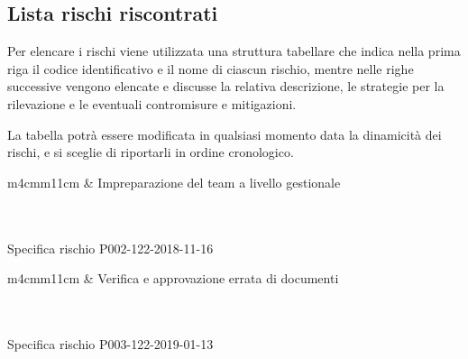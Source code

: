 	\subsection{Lista rischi riscontrati}

	Per elencare i rischi viene utilizzata una struttura tabellare che indica nella prima riga il codice identificativo e il nome di ciascun rischio,
	mentre nelle righe successive vengono elencate e discusse la relativa descrizione, le strategie per la rilevazione e le eventuali contromisure e mitigazioni.\par

	La tabella potrà essere modificata in qualsiasi momento data la dinamicità dei rischi, e si sceglie di riportarli in ordine cronologico.


	\begin{table}[H]
		\begin{risktable}{\columnwidth}{m{4cm}m{11cm}}
			 &
			Impreparazione del team a livello gestionale \\
			\rowcolor{\tablegray}
			\\
			\\
		\end{risktable}
		\caption{Specifica rischio P002-122-2018-11-16}
	\end{table}

	\mydoublerule{\linewidth}{0pt}{2pt}

	\begin{table}[H]
		\begin{risktable}{\columnwidth}{m{4cm}m{11cm}}
			 &
			Verifica e approvazione errata di documenti \\
			\rowcolor{\tablegray}
			\\
			\\
		\end{risktable}
		\caption{Specifica rischio P003-122-2019-01-13}
	\end{table}

